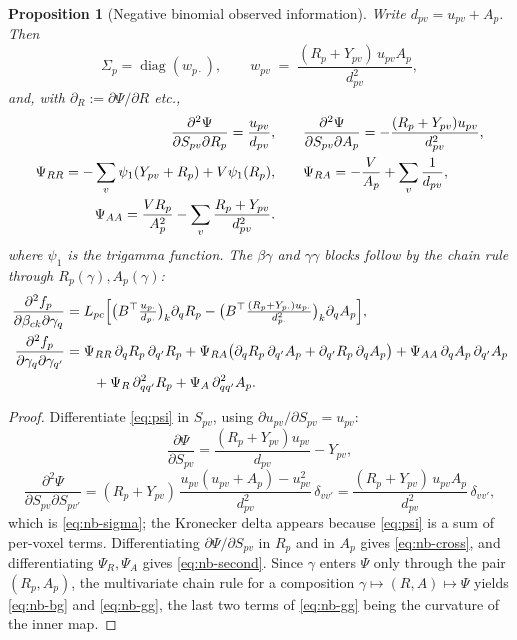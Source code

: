 \documentclass[11pt,a4paper]{article}
\theoremstyle{plain}
\newtheorem{proposition}{Proposition}
\theoremstyle{definition}
\newcommand{\diag}{\operatorname{diag}}
\begin{document}
\begin{proposition}[Negative binomial observed information]\label{prop:nb}
Write $d_{pv} = u_{pv}+A_p$. Then
\begin{equation}\label{eq:nb-sigma}
  \Sigma_p = \diag(w_{p\cdot}), \qquad
  w_{pv} \;=\; \frac{(R_p + Y_{pv})\, u_{pv} A_p}{d_{pv}^{2}} ,
\end{equation}
and, with $\partial_R := \partial \Psi/\partial R$ etc.,
\begin{align}
  \frac{\partial^2 \Psi}{\partial S_{pv}\partial R_p} = \frac{u_{pv}}{d_{pv}},
  &\qquad
  \frac{\partial^2 \Psi}{\partial S_{pv}\partial A_p} = -\frac{(R_p+Y_{pv})u_{pv}}{d_{pv}^{2}},
    \label{eq:nb-cross}\\
  \Psi_{RR} = -\sum_v \psi_1(Y_{pv}+R_p) + V\psi_1(R_p),
  &\qquad
  \Psi_{RA} = -\frac{V}{A_p} + \sum_v \frac{1}{d_{pv}},\notag\\
  \Psi_{AA} = \frac{VR_p}{A_p^2} - \sum_v \frac{R_p+Y_{pv}}{d_{pv}^{2}}.&
    \label{eq:nb-second}
\end{align}
where $\psi_1$ is the trigamma function. The $\beta\gamma$ and $\gamma\gamma$ blocks follow by
the chain rule through $R_p(\gamma), A_p(\gamma)$:
\begin{align}
  \frac{\partial^2 f_p}{\partial \beta_{ck}\partial\gamma_q}
   &= L_{pc}\Bigl[\bigl(B^\top \tfrac{u_{p\cdot}}{d_{p\cdot}}\bigr)_k \partial_q R_p
      - \bigl(B^\top \tfrac{(R_p+Y_{p\cdot})u_{p\cdot}}{d_{p\cdot}^2}\bigr)_k \partial_q A_p
      \Bigr], \label{eq:nb-bg}\\
  \frac{\partial^2 f_p}{\partial \gamma_q\partial\gamma_{q'}}
   &= \Psi_{RR}\,\partial_q R_p\, \partial_{q'} R_p
    + \Psi_{RA}\bigl(\partial_q R_p\, \partial_{q'} A_p + \partial_{q'} R_p\, \partial_q A_p\bigr)
    + \Psi_{AA}\, \partial_q A_p\, \partial_{q'} A_p\notag\\
   &\qquad{}+ \Psi_{R}\, \partial^2_{qq'} R_p + \Psi_{A}\, \partial^2_{qq'} A_p.
    \label{eq:nb-gg}
\end{align}
\end{proposition}

\begin{proof}
Differentiate \eqref{eq:psi} in $S_{pv}$, using $\partial u_{pv}/\partial S_{pv} = u_{pv}$:
\[
  \frac{\partial \Psi}{\partial S_{pv}} = \frac{(R_p+Y_{pv})u_{pv}}{d_{pv}} - Y_{pv},
\]
\[
  \frac{\partial^2 \Psi}{\partial S_{pv}\partial S_{pv'}}
    = (R_p+Y_{pv})\,\frac{u_{pv}(u_{pv}+A_p) - u_{pv}^2}{d_{pv}^2}\,\delta_{vv'}
    = \frac{(R_p+Y_{pv})\,u_{pv}A_p}{d_{pv}^2}\,\delta_{vv'},
\]
which is \eqref{eq:nb-sigma}; the Kronecker delta appears because \eqref{eq:psi} is a sum of
per-voxel terms. Differentiating $\partial\Psi/\partial S_{pv}$ in $R_p$ and in $A_p$ gives
\eqref{eq:nb-cross}, and differentiating $\Psi_R, \Psi_A$ gives \eqref{eq:nb-second}. Since
$\gamma$ enters $\Psi$ only through the pair $(R_p, A_p)$, the multivariate chain rule for a
composition $\gamma \mapsto (R,A) \mapsto \Psi$ yields \eqref{eq:nb-bg} and \eqref{eq:nb-gg}, the
last two terms of \eqref{eq:nb-gg} being the curvature of the inner map.
\end{proof}
\end{document}

